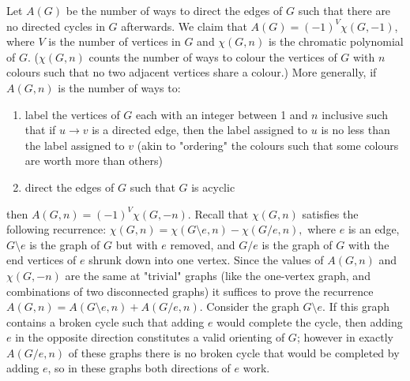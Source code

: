 \begin{solution}
    Let $A(G)$ be the number of ways to direct the edges of $G$ such that there are no 
    directed cycles in $G$ afterwards. We claim that $A(G) = (-1)^V\chi(G, -1)$, where $V$ 
    is the number of vertices in $G$ and $\chi(G, n)$ is the chromatic polynomial of $G$. 
    ($\chi(G, n)$ counts the number of ways to colour the vertices of $G$ with $n$ colours such 
    that no two adjacent vertices share a colour.)
    More generally, if $A(G, n)$ is the number of ways to: 
    \begin{enumerate}[noitemsep]
        \item label the vertices of $G$ each with an integer between 1 and $n$ inclusive such that if 
        $u \to v$ is a directed edge, then the label assigned to $u$ is no less than the label 
        assigned to $v$ (akin to "ordering" the colours such that some colours are worth more than others)
        \item direct the edges of $G$ such that $G$ is acyclic
    \end{enumerate}
    then $A(G, n) = (-1)^V\chi(G, -n)$. Recall that $\chi(G, n)$ satisfies the following recurrence: 
    $\chi(G, n) = \chi(G\setminus e, n) - \chi(G/e, n),$ where $e$ is an edge, $G\setminus e$ 
    is the graph of $G$ but with $e$ removed, and $G/e$ is the graph of $G$ with the end vertices 
    of $e$ shrunk down into one vertex. Since the values of $A(G, n)$ and $\chi(G, -n)$ are the same 
    at "trivial" graphs (like the one-vertex graph, and combinations of two disconnected graphs) 
    it suffices to prove the recurrence $A(G, n) = A(G\setminus e, n) + A(G/e, n)$. 
    Consider the graph $G\setminus e$. If this graph contains a broken cycle such that adding $e$ 
    would complete the cycle, then adding $e$ in the opposite direction constitutes a valid 
    orienting of $G$; however in exactly $A(G/e, n)$ of these graphs there is no broken 
    cycle that would be completed by adding $e$, so in these graphs both directions of $e$ work. 
\end{solution}\bigskip
